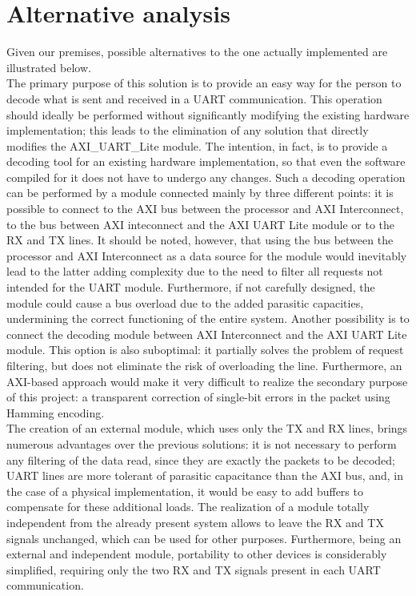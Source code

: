 \documentclass[11pt]{article}
\begin{document}
	\section{Alternative analysis}
	Given our premises, possible alternatives to the one actually implemented are illustrated below. \\
	The primary purpose of this solution is to provide an easy way for the person to decode what is sent and received in a UART communication.
	This operation should ideally be performed without significantly modifying the existing hardware implementation; this leads to the elimination of any solution that directly modifies the AXI\_UART\_Lite module. The intention, in fact, is to provide a decoding tool for an existing hardware implementation, so that even the software compiled for it does not have to undergo any changes.
	Such a decoding operation can be performed by a module connected mainly by three different points: it is possible to connect to the AXI bus between the processor and AXI Interconnect, to the bus between AXI inteconnect and the AXI UART Lite module or to the RX and TX lines.
	It should be noted, however, that using the bus between the processor and AXI Interconnect as a data source for the module would inevitably lead to the latter adding complexity due to the need to filter all requests not intended for the UART module. Furthermore, if not carefully designed, the module could cause a bus overload due to the added parasitic capacities, undermining the correct functioning of the entire system.
	Another possibility is to connect the decoding module between AXI Interconnect and the AXI UART Lite module. This option is also suboptimal: it partially solves the problem of request filtering, but does not eliminate the risk of overloading the line. Furthermore, an AXI-based approach would make it very difficult to realize the secondary purpose of this project: a transparent correction of single-bit errors in the packet using Hamming encoding.\\
	The creation of an external module, which uses only the TX and RX lines, brings numerous advantages over the previous solutions: it is not necessary to perform any filtering of the data read, since they are exactly the packets to be decoded; UART lines are more tolerant of parasitic capacitance than the AXI bus, and, in the case of a physical implementation, it would be easy to add buffers to compensate for these additional loads. The realization of a module totally independent from the already present system allows to leave the RX and TX signals unchanged, which can be used for other purposes. Furthermore, being an external and independent module, portability to other devices is considerably simplified, requiring only the two RX and TX signals present in each UART communication.		
\end{document}
